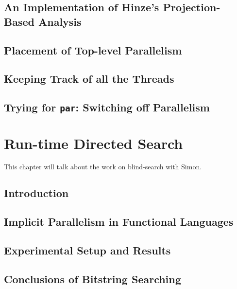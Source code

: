 \documentclass[dottedtoc, headinclude, footinclude=true, a4paper]{scrreprt}
\begin{document}
    \section{An Implementation of Hinze's Projection-Based Analysis}
    \label{sec:hinzeImplementation}
    
    \section{Placement of Top-level Parallelism}
    \label{sec:parPlacement}
    

    \section{Keeping Track of all the Threads}
    \label{sec:logging}
    

    \section{Trying for \texttt{par}: Switching off Parallelism}
    \label{sec:parSwitching}
    

\chapter{Run-time Directed Search}

    This chapter will talk about the work on blind-search with Simon.

    \section{Introduction}
    

    \section{Implicit Parallelism in Functional Languages}
    \label{sec:blind-ParFunc}
    

    \section{Experimental Setup and Results}
    \label{sec:blind-Results}
    

    \section{Conclusions of Bitstring Searching}
    \label{sec:blind-Conclusion}
    
\end{document}
